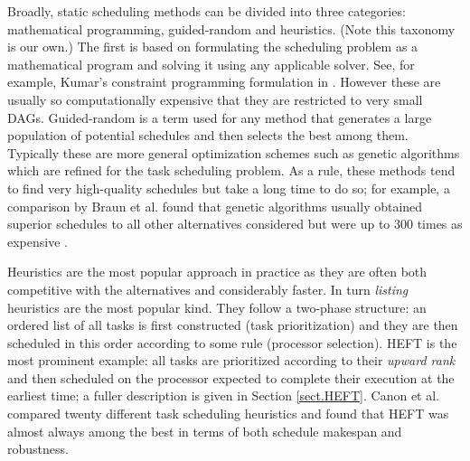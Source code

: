 \documentclass[runningheads]{llncs}
\begin{document}
Broadly, static scheduling methods can be divided into three categories: mathematical programming, guided-random and heuristics. (Note this taxonomy is our own.) The first is based on formulating the scheduling problem as a mathematical program and solving it using any applicable solver. See, for example, Kumar's constraint programming formulation in \cite{kumar:tel-01538516}. However these are usually so computationally expensive that they are restricted to very small DAGs. Guided-random is a term used for any method that generates a large population of potential schedules and then selects the best among them. Typically these are more general optimization schemes such as genetic algorithms which are refined for the task scheduling problem. As a rule, these methods tend to find very high-quality schedules but take a long time to do so; for example, a comparison by Braun et al. found that genetic algorithms usually obtained superior schedules to all other alternatives considered but were up to 300 times as expensive \cite{BRAUN2001810}. 

Heuristics are the most popular approach in practice as they are often both competitive with the alternatives and considerably faster. In turn {\em listing} heuristics are the most popular kind. They follow a two-phase structure: an ordered list of all tasks is first constructed (task prioritization) and they are then scheduled in this order according to some rule (processor selection). HEFT is the most prominent example: all tasks are prioritized according to their {\em upward rank} and then scheduled on the processor expected to complete their execution at the earliest time; a fuller description is given in Section \ref{sect.HEFT}. Canon et al. \cite{canon2008comparative} compared twenty different task scheduling heuristics and found that HEFT was almost always among the best in terms of both schedule makespan and robustness.

\end{document}
